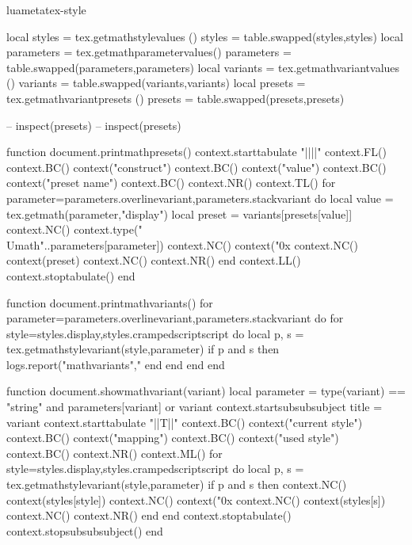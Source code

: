 
\environment luametatex-style

\startdocument[title=Constructions]

\startluacode
local styles     = tex.getmathstylevalues    () styles     = table.swapped(styles,styles)
local parameters = tex.getmathparametervalues() parameters = table.swapped(parameters,parameters)
local variants   = tex.getmathvariantvalues  () variants   = table.swapped(variants,variants)
local presets    = tex.getmathvariantpresets () presets    = table.swapped(presets,presets)

-- inspect(presets)
-- inspect(presets)

function document.printmathpresets()
    context.starttabulate { "||||" }
    context.FL()
    context.BC() context("construct")
    context.BC() context("value")
    context.BC() context("preset name")
    context.BC() context.NR()
    context.TL()
    for parameter=parameters.overlinevariant,parameters.stackvariant do
        local value  = tex.getmath(parameter,"display")
        local preset = variants[presets[value]]
        context.NC() context.type("\\Umath"..parameters[parameter])
        context.NC() context("0x%
        context.NC() context(preset)
        context.NC() context.NR()
    end
    context.LL()
    context.stoptabulate()
end

function document.printmathvariants()
    for parameter=parameters.overlinevariant,parameters.stackvariant do
        for style=styles.display,styles.crampedscriptscript do
            local p, s = tex.getmathstylevariant(style,parameter)
            if p and s then
                 logs.report("mathvariants","%
            end
        end
    end
end

function document.showmathvariant(variant)
    local parameter = type(variant) == "string" and parameters[variant] or variant
    context.startsubsubsubject { title = variant }
    context.starttabulate { "||T||" }
    context.BC() context("current style")
    context.BC() context("mapping")
    context.BC() context("used style")
    context.BC() context.NR()
    context.ML()
    for style=styles.display,styles.crampedscriptscript do
        local p, s = tex.getmathstylevariant(style,parameter)
        if p and s then
            context.NC() context(styles[style])
            context.NC() context("0x%
            context.NC() context(styles[s])
            context.NC() context.NR()
        end
    end
    context.stoptabulate()
    context.stopsubsubsubject()
end
\stopluacode

